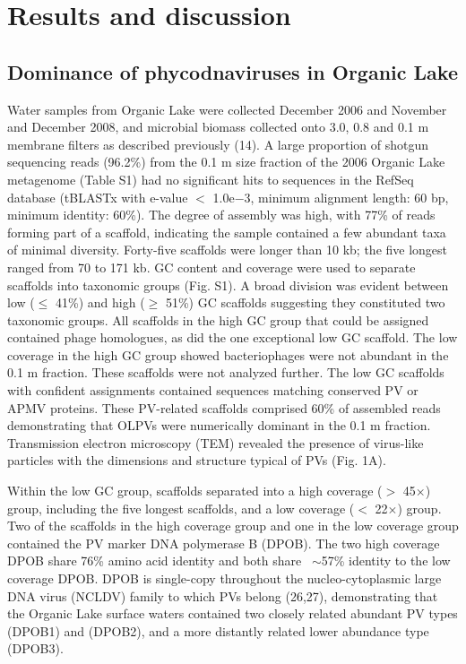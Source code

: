 \section{Results and discussion}
\subsection{Dominance of phycodnaviruses in Organic Lake}
Water samples from Organic Lake were collected December 2006 and November and December 2008, and microbial biomass collected onto 3.0, 0.8 and 0.1 \textmu{}m membrane filters as described previously (14). 
A large proportion of shotgun sequencing reads (96.2\%) from the 0.1 \textmu{}m size fraction of the 2006 Organic Lake metagenome (Table S1) had no significant hits to sequences in the RefSeq database 
(tBLASTx with e-value $<$ 1.0e$-$3, minimum alignment length: 60 bp, minimum identity: 60\%). 
The degree of assembly was high, with 77\% of reads forming part of a scaffold, indicating the sample contained a few abundant taxa of minimal diversity. 
Forty-five scaffolds were longer than 10 kb; the five longest ranged from 70 to 171 kb. 
GC content and coverage were used to separate scaffolds into taxonomic groups (Fig. S1). 
A broad division was evident between low ($\le$ 41\%) and high ($\ge$ 51\%) GC scaffolds suggesting they constituted two taxonomic groups. 
All scaffolds in the high GC group that could be assigned contained phage homologues, as did the one exceptional low GC scaffold. 
The low coverage in the high GC group showed bacteriophages were not abundant in the 0.1 \textmu{}m fraction. 
These scaffolds were not analyzed further. 
The low GC scaffolds with confident assignments contained sequences matching conserved PV or APMV proteins. 
These PV-related scaffolds comprised 60\% of assembled reads demonstrating that OLPVs were numerically dominant in the 0.1 \textmu{}m fraction. 
Transmission electron microscopy (TEM) revealed the presence of virus-like particles with the dimensions and structure typical of PVs (Fig. 1A).

Within the low GC group, scaffolds separated into a high coverage ($>$ 45$\times$) group, including the five longest scaffolds, and a low coverage ($<$ 22$\times$) group. 
Two of the scaffolds in the high coverage group and one in the low coverage group contained the PV marker DNA polymerase B (DPOB). 
The two high coverage DPOB share 76\% amino acid identity and both share ~$\sim$57\% identity to the low coverage DPOB. 
DPOB is single-copy throughout the nucleo-cytoplasmic large DNA virus (NCLDV) family to which PVs belong (26,27), 
demonstrating that the Organic Lake surface waters contained two closely related abundant PV types (DPOB1) and (DPOB2), and a more distantly related lower abundance type (DPOB3). 

